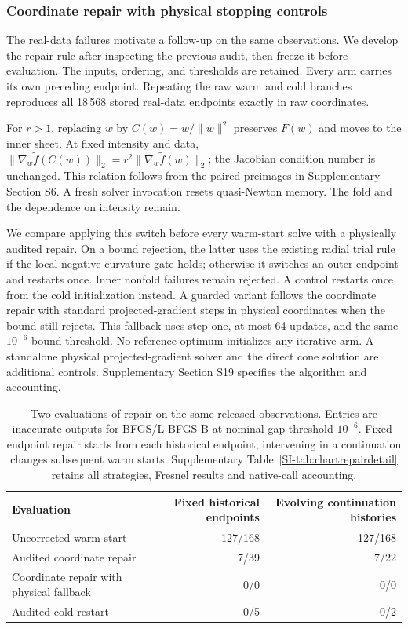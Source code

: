 \documentclass[pdflatex,sn-mathphys-num]{sn-jnl}
\begin{document}
\subsubsection{Coordinate repair with physical stopping controls}
\label{sec:chartrepair}
The real-data failures motivate a follow-up on the same observations. We develop the repair rule after inspecting the previous audit, then freeze it before evaluation. The inputs, ordering, and thresholds are retained. Every arm carries its own preceding endpoint. Repeating the raw warm and cold branches reproduces all 18\,568 stored real-data endpoints exactly in raw coordinates.

For $r>1$, replacing $w$ by $C(w)=w/\|w\|^2$ preserves $F(w)$ and moves to the inner sheet. At fixed intensity and data, $\|\nabla_w\widetilde f(C(w))\|_2=r^2\|\nabla_w\widetilde f(w)\|_2$; the Jacobian condition number is unchanged. This relation follows from the paired preimages in Supplementary Section S6. A fresh solver invocation resets quasi-Newton memory. The fold and the dependence on intensity remain.

We compare applying this switch before every warm-start solve with a physically audited repair. On a bound rejection, the latter uses the existing radial trial rule if the local negative-curvature gate holds; otherwise it switches an outer endpoint and restarts once. Inner nonfold failures remain rejected. A control restarts once from the cold initialization instead. A guarded variant follows the coordinate repair with standard projected-gradient steps in physical coordinates when the bound still rejects. This fallback uses step one, at most 64 updates, and the same $10^{-6}$ bound threshold. No reference optimum initializes any iterative arm. A standalone physical projected-gradient solver and the direct cone solution are additional controls. Supplementary Section S19 specifies the algorithm and accounting.

\begin{table}[!t]
\caption{Two evaluations of repair on the same released observations. Entries are inaccurate outputs for BFGS/L-BFGS-B at nominal gap threshold $10^{-6}$. Fixed-endpoint repair starts from each historical endpoint; intervening in a continuation changes subsequent warm starts. Supplementary Table~\ref{SI-tab:chartrepairdetail} retains all strategies, Fresnel results and native-call accounting.}
\label{tab:chartrepair}
\centering\small\renewcommand{\arraystretch}{1.12}
\begin{tabularx}{\textwidth}{@{}Xrr@{}}\toprule
Evaluation & Fixed historical endpoints & Evolving continuation histories\\\midrule
Uncorrected warm start & 127/168 & 127/168\\
Audited coordinate repair & 7/39 & 7/22\\
Coordinate repair with physical fallback & 0/0 & 0/0\\
Audited cold restart & 0/5 & 0/2\\\bottomrule
\end{tabularx}
\end{table}
\end{document}
